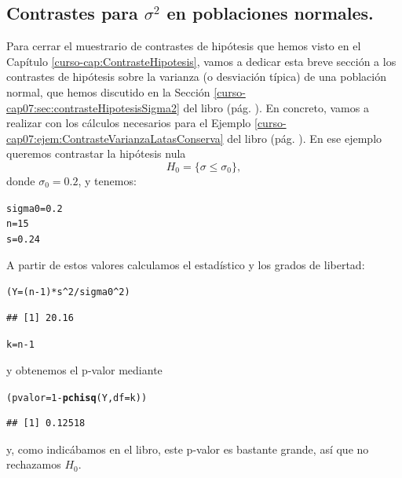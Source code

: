 \documentclass[10pt,a4paper]{article}\usepackage[]{graphicx}\usepackage[]{color}
\makeatletter
\newcommand{\hlnum}[1]{\textcolor[rgb]{0.686,0.059,0.569}{#1}}%
\newcommand{\hlopt}[1]{\textcolor[rgb]{0,0,0}{#1}}%
\newcommand{\hlstd}[1]{\textcolor[rgb]{0.345,0.345,0.345}{#1}}%
\newcommand{\hlkwb}[1]{\textcolor[rgb]{0.69,0.353,0.396}{#1}}%
\newcommand{\hlkwc}[1]{\textcolor[rgb]{0.333,0.667,0.333}{#1}}%
\newcommand{\hlkwd}[1]{\textcolor[rgb]{0.737,0.353,0.396}{\textbf{#1}}}%
\newenvironment{kframe}{%
 \def\at@end@of@kframe{}%
 \ifinner\ifhmode%
  \def\at@end@of@kframe{\end{minipage}}%
  \begin{minipage}{\columnwidth}%
 \fi\fi%
 \def\FrameCommand##1{\hskip\@totalleftmargin \hskip-\fboxsep
 \colorbox{shadecolor}{##1}\hskip-\fboxsep
     \hskip-\linewidth \hskip-\@totalleftmargin \hskip\columnwidth}%
 \MakeFramed {\advance\hsize-\width
   \@totalleftmargin\z@ \linewidth\hsize
   \@setminipage}}%
 {\par\unskip\endMakeFramed%
 \at@end@of@kframe}
\newenvironment{knitrout}{}{} %
\newcounter {cont01}
\makeatother
\begin{document}
\subsection{Contrastes para $\sigma^2$ en poblaciones normales.}
\label{tut07:subsec:ContrastesSigma2}

Para cerrar el muestrario de contrastes de hipótesis que hemos visto en el Capítulo \ref{curso-cap:ContrasteHipotesis}, vamos a dedicar esta breve sección a los contrastes de hipótesis sobre la varianza (o desviación típica) de una población normal, que hemos discutido en la Sección \ref{curso-cap07:sec:contrasteHipotesisSigma2} del libro (pág. \pageref{curso-cap07:sec:contrasteHipotesisSigma2}). En concreto, vamos a realizar con los cálculos necesarios para el Ejemplo
\ref{curso-cap07:ejem:ContrasteVarianzaLatasConserva} del libro (pág.
\pageref{curso-cap07:ejem:ContrasteVarianzaLatasConserva}). En ese ejemplo queremos contrastar la hipótesis nula
\[H_0=\{\sigma\leq \sigma_0\},\]
donde $\sigma_0=0.2$, y tenemos:
\begin{knitrout}
\color{fgcolor}\begin{kframe}
\begin{alltt}
\hlstd{sigma0} \hlkwb{=} \hlnum{0.2}
\hlstd{n} \hlkwb{=} \hlnum{15}
\hlstd{s} \hlkwb{=} \hlnum{0.24}
\end{alltt}
\end{kframe}
\end{knitrout}
A partir de estos valores calculamos el estadístico y los grados de libertad:
\begin{knitrout}
\color{fgcolor}\begin{kframe}
\begin{alltt}
\hlstd{(Y} \hlkwb{=} \hlstd{(n}\hlopt{-}\hlnum{1}\hlstd{)} \hlopt{*} \hlstd{s}\hlopt{^}\hlnum{2} \hlopt{/} \hlstd{sigma0}\hlopt{^}\hlnum{2}\hlstd{)}
\end{alltt}
\begin{verbatim}
## [1] 20.16
\end{verbatim}
\begin{alltt}
\hlstd{k} \hlkwb{=} \hlstd{n} \hlopt{-} \hlnum{1}
\end{alltt}
\end{kframe}
\end{knitrout}
y obtenemos el p-valor mediante
\begin{knitrout}
\color{fgcolor}\begin{kframe}
\begin{alltt}
\hlstd{(pvalor} \hlkwb{=} \hlnum{1} \hlopt{-} \hlkwd{pchisq}\hlstd{(Y,} \hlkwc{df} \hlstd{= k))}
\end{alltt}
\begin{verbatim}
## [1] 0.12518
\end{verbatim}
\end{kframe}
\end{knitrout}
y, como indicábamos en el libro, este p-valor es bastante grande, así que no rechazamos $H_0$.
\end{document}
